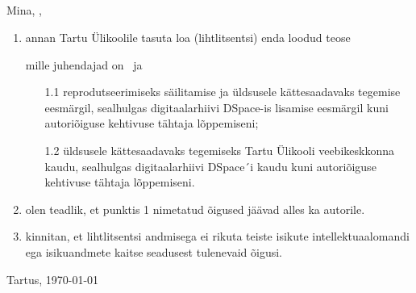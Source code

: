 \begin{appendices}
{{\subsection*{\topic}

Mina, \textbf{\Author},

\begin{enumerate}
\item
annan Tartu Ülikoolile tasuta loa (lihtlitsentsi) enda loodud teose

\textbf{\topic}

mille juhendajad on \JuhendajaName\ ja \KaasjuhendajaName

\begin{enumerate}
\item[1.1]
reprodutseerimiseks säilitamise ja üldsusele kättesaadavaks tegemise eesmärgil, sealhulgas digitaalarhiivi DSpace-is lisamise eesmärgil kuni autoriõiguse kehtivuse tähtaja lõppemiseni;
\item[1.2]
üldsusele kättesaadavaks tegemiseks Tartu Ülikooli veebikeskkonna kaudu, sealhulgas digitaalarhiivi DSpace´i kaudu kuni autoriõiguse kehtivuse tähtaja lõppemiseni.
\end{enumerate}


\item
olen teadlik, et punktis 1 nimetatud õigused jäävad alles ka autorile.
\item
kinnitan, et lihtlitsentsi andmisega ei rikuta teiste isikute intellektuaalomandi ega isikuandmete kaitse seadusest tulenevaid õigusi.
\end{enumerate}


Tartus, \today
}}%



\end{appendices}
